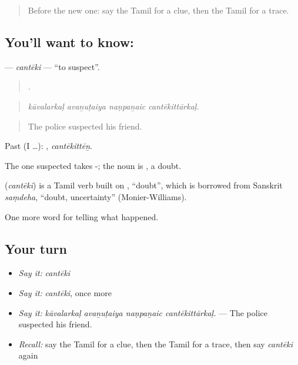 \label{lesson:TA-C295-canteki}



\begin{quote}
Before the new one: say the Tamil for a clue, then the Tamil for a trace.
\end{quote}

\subsection*{You'll want to know: }
\textbf{} — \emph{cantēki} — \textquotedblleft{}to suspect\textquotedblright{}.

\begin{quote}
   .
\end{quote}

\begin{quote}
\emph{kāvalarkaḷ avaṉuṭaiya naṇpaṉaic cantēkittārkaḷ.}
\end{quote}

\begin{quote}
The police suspected his friend.
\end{quote}

Past (I …): , \emph{cantēkittēṉ}.

The one suspected takes -; the noun is , a doubt.

\begin{cousinweb}
\textbf{} (\emph{cantēki}) is a Tamil verb built on , \textquotedblleft{}doubt\textquotedblright{}, which is borrowed from Sanskrit \emph{saṃdeha}, \textquotedblleft{}doubt, uncertainty\textquotedblright{} (Monier-Williams).
\end{cousinweb}

\begin{grammarlens}[title={What you've built}]
One more word for telling what happened.
\end{grammarlens}

\subsection*{Your turn}
\begin{itemize}
\raggedright
  \item \emph{Say it:} \emph{cantēki}
  \item \emph{Say it:} \emph{cantēki}, once more
  \item \emph{Say it:} \emph{kāvalarkaḷ avaṉuṭaiya naṇpaṉaic cantēkittārkaḷ.} — The police suspected his friend.
  \item \emph{Recall:} say the Tamil for a clue, then the Tamil for a trace, then say \emph{cantēki} again
\end{itemize}


